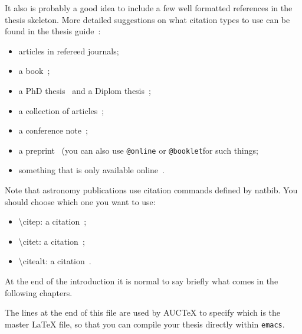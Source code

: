 It also is probably a good idea to include a few well formatted
references in the thesis skeleton. More detailed suggestions on what
citation types to use can be found in the thesis
guide~\citep{thesis-guide}:
\begin{itemize}
\item articles in refereed journals\citep{pdg2010,Aad:2010ey};
\item a book~\citep{Halzen:1984mc};
\item a PhD thesis~\citep{tlodd:2012} and a Diplom thesis~\citep{mergelmeyer:2011};
\item a collection of articles~\citep{lhc:vol1};
\item a conference note~\citep{ATLAS-CONF-2011-008};
\item a preprint~\citep{atlas:perf:2009} (you can also use
  \texttt{@online} or \texttt{@booklet}for such things;
\item something that is only available online~\citep{thesis-guide}.
\end{itemize}
Note that astronomy publications use citation commands defined by \textsf{natbib}.
You should choose which one you want to use:
\begin{itemize}
\item \textbackslash citep: a citation~\citep{pdg2010,Aad:2010ey};
\item \textbackslash citet: a citation~\citet{pdg2010,Aad:2010ey};
\item \textbackslash citealt: a citation~\citealt{pdg2010,Aad:2010ey}.
\end{itemize}

At the end of the introduction it is normal to say briefly what comes
in the following chapters.

The lines at the end of this file are used by AUCTeX to specify which
is the master \LaTeX{} file, so that you can compile your thesis
directly within \texttt{emacs}.

\printbibliography[heading=subbibliography]

